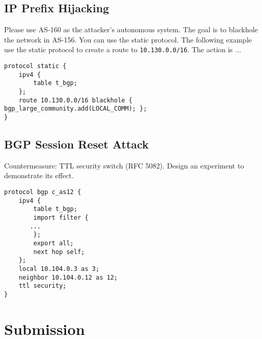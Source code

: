 \subsection{IP Prefix Hijacking} 

Please use AS-160 as the attacker's autonomous system.
The goal is to blackhole the network in AS-156.
You can use the static protocol. The following example
use the static protocol to create a route 
to \texttt{10.130.0.0/16}. The action is ... 

\begin{lstlisting}
protocol static {
    ipv4 {
        table t_bgp;
    };
    route 10.130.0.0/16 blackhole { bgp_large_community.add(LOCAL_COMM); };
}
\end{lstlisting}


\subsection{BGP Session Reset Attack} 



Countermeasure: TTL security switch (RFC 5082).
Design an experiment to demonstrate its effect.

\begin{lstlisting}
protocol bgp c_as12 {
    ipv4 {
        table t_bgp;
        import filter {
	   ...
        };
        export all;
        next hop self;
    };
    local 10.104.0.3 as 3;
    neighbor 10.104.0.12 as 12;
    ttl security;
}
\end{lstlisting}
 

 


\section{Submission}








